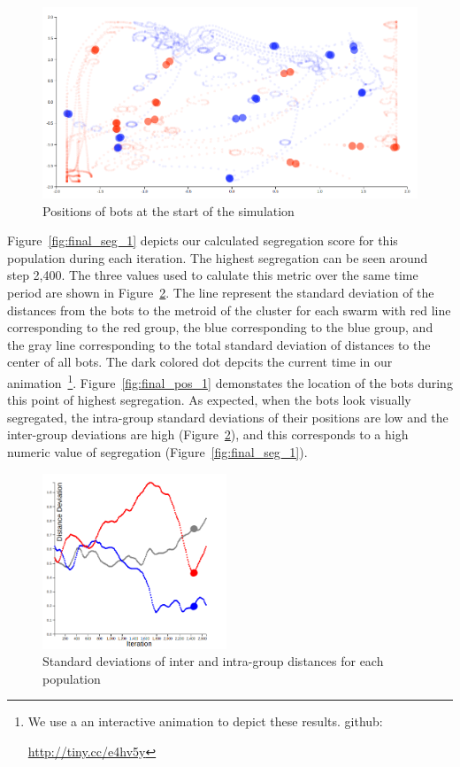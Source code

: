 \begin{figure}
    \centering
    \includegraphics[width=\linewidth]{imgs/init_place_1.png}
    \caption{Positions of bots at the start of the simulation}
    \label{fig:init_pos_1}
\end{figure}

Figure~\ref{fig:final_seg_1} depicts our calculated segregation score for this population during each iteration. 
The highest segregation can be seen around step 2,400. 
The three values used to calulate this metric over the same time period are shown in Figure~\ref{fig:final_dev_1}. 
The line represent the standard deviation of the distances from the bots to the metroid of the cluster for each swarm with red line corresponding to the red group, the blue corresponding to the blue group, and the gray line corresponding to the total standard deviation of distances to the center of all bots. 
The dark colored dot depcits the current time in our animation~\footnote{We use a an interactive animation to depict these results. github:

\url{http://tiny.cc/e4hv5y}}.
Figure~\ref{fig:final_pos_1} demonstates the location of the bots during this point of highest segregation. 
As expected, when the bots look visually segregated, the intra-group standard deviations of their positions are low and the inter-group deviations are high (Figure~\ref{fig:final_dev_1}), and this corresponds to a high numeric value of segregation (Figure~\ref{fig:final_seg_1}). 

\begin{figure}
    \centering
    \includegraphics[width=5.5cm]{imgs/final_dev_1.png}
    \caption{Standard deviations of inter and intra-group distances for each population}
    \label{fig:final_dev_1}
\end{figure}

